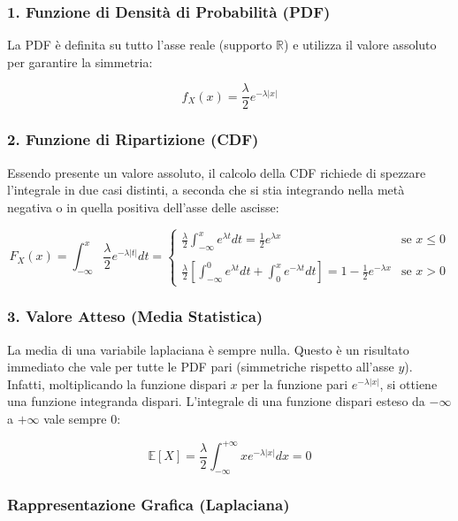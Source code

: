 \subsubsection{1. Funzione di Densità di Probabilità (PDF)}
La PDF è definita su tutto l'asse reale (supporto $\mathbb{R}$) e utilizza il valore assoluto per garantire la simmetria:

\begin{equation}
f_X(x) = \frac{\lambda}{2} e^{-\lambda |x|}
\end{equation}

\subsubsection{2. Funzione di Ripartizione (CDF)}
Essendo presente un valore assoluto, il calcolo della CDF richiede di spezzare l'integrale in due casi distinti, a seconda che si stia integrando nella metà negativa o in quella positiva dell'asse delle ascisse:

\begin{equation}
F_X(x) = \int_{-\infty}^{x} \frac{\lambda}{2} e^{-\lambda |t|} dt = 
\begin{cases} 
\frac{\lambda}{2} \int_{-\infty}^{x} e^{\lambda t} dt = \frac{1}{2} e^{\lambda x} & \text{se } x \le 0 \\ 
\\
\frac{\lambda}{2} \left[ \int_{-\infty}^{0} e^{\lambda t} dt + \int_{0}^{x} e^{-\lambda t} dt \right] = 1 - \frac{1}{2} e^{-\lambda x} & \text{se } x > 0
\end{cases}
\end{equation}

\subsubsection{3. Valore Atteso (Media Statistica)}
La media di una variabile laplaciana è sempre nulla. Questo è un risultato immediato che vale per tutte le PDF pari (simmetriche rispetto all'asse $y$). 
Infatti, moltiplicando la funzione dispari $x$ per la funzione pari $e^{-\lambda |x|}$, si ottiene una funzione integranda dispari. L'integrale di una funzione dispari esteso da $-\infty$ a $+\infty$ vale sempre $0$:

\begin{equation}
\mathbb{E}[X] = \frac{\lambda}{2} \int_{-\infty}^{+\infty} x e^{-\lambda |x|} dx = 0
\end{equation}

\subsubsection{Rappresentazione Grafica (Laplaciana)}

